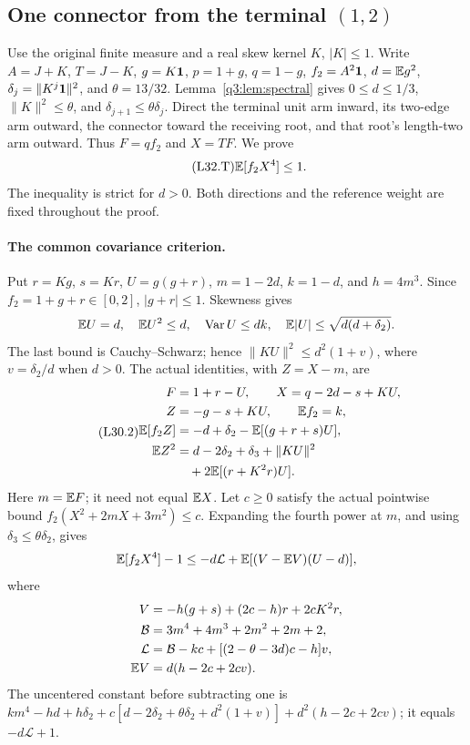 \subsection{One connector from the terminal \((1,2)\)}
\label{proof:Q5-C032}

Use the original finite measure and a real skew kernel \(K\), \(|K|\le1\).
Write \(A=J+K\), \(T=J-K\), \(g=K\mathbf1\), \(p=1+g\),
\(q=1-g\), \(f_2=A^2\mathbf1\), \(d=\mathbb E g^2\),
\(\delta_j=\|K^j\mathbf1\|^2\), and \(\theta=13/32\).
Lemma~\ref{q3:lem:spectral} gives \(0\le d\le1/3\),
\(\|K\|^2\le\theta\), and
\(\delta_{j+1}\le\theta\delta_j\).
Direct the terminal unit arm inward, its two-edge arm outward, the
connector toward the receiving root, and that root's length-two arm
outward. Thus \(F=qf_2\) and \(X=TF\). We prove
\begin{equation}\tag{L32.T}\label{eq:L32:claim}
 \mathbb E[f_2X^4]\le1.
\end{equation}
The inequality is strict for \(d>0\). Both directions and the reference
weight are fixed throughout the proof.

\paragraph{The common covariance criterion.}
Put \(r=Kg\), \(s=Kr\), \(U=g(g+r)\),
\(m=1-2d\), \(k=1-d\), and \(h=4m^3\).
Since \(f_2=1+g+r\in[0,2]\), \(|g+r|\le1\). Skewness gives
\[
 \mathbb E U=d,\quad \mathbb E U^2\le d,\quad
 \operatorname{Var}U\le dk,\quad
 \mathbb E|U|\le\sqrt{d(d+\delta_2)}.
\]
The last bound is Cauchy--Schwarz; hence
\(\|KU\|^2\le d^2(1+v)\), where \(v=\delta_2/d\) when \(d>0\).
The actual identities, with \(Z=X-m\), are
\begin{equation}\tag{L30.2}\label{eq:L30:ledger}
\begin{aligned}
 F&=1+r-U,\qquad X=q-2d-s+KU,\\
 Z&=-g-s+KU,\qquad \mathbb E f_2=k,\\
 \mathbb E[f_2Z]&=-d+\delta_2-\mathbb E[(g+r+s)U],\\
 \mathbb E Z^2&=d-2\delta_2+\delta_3+\|KU\|^2\\
 &\quad+2\mathbb E[(r+K^2r)U].
\end{aligned}
\end{equation}
Here \(m=\mathbb E F\); it need not equal \(\mathbb E X\).
Let \(c\ge0\) satisfy the actual pointwise bound
\(f_2(X^2+2mX+3m^2)\le c\).
Expanding the fourth power at \(m\), and using
\(\delta_3\le\theta\delta_2\), gives
\[
 \mathbb E[f_2X^4]-1\le-d\mathcal L
                  +\mathbb E[(V-\mathbb E V)(U-d)],
\]
where
\begin{align*}
 V&=-h(g+s)+(2c-h)r+2cK^2r,\\
 \mathcal B&=3m^4+4m^3+2m^2+2m+2,\\
 \mathcal L&=\mathcal B-kc+[(2-\theta-3d)c-h]v,\\
 \mathbb E V&=d(h-2c+2cv).
\end{align*}
The uncentered constant before subtracting one is
\(km^4-hd+h\delta_2+c[d-2\delta_2+\theta\delta_2+d^2(1+v)]
+d^2(h-2c+2cv)\); it equals \(-d\mathcal L+1\).

